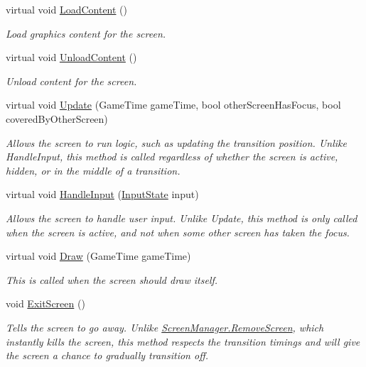 \begin{DoxyCompactItemize}
\item 
virtual void \hyperlink{classCityMania_1_1TEMP_1_1GUI_a12d7db05d306439cb79b57e379c45091}{LoadContent} ()
\begin{DoxyCompactList}\small\item\em Load graphics content for the screen. \item\end{DoxyCompactList}\item 
virtual void \hyperlink{classCityMania_1_1TEMP_1_1GUI_abc0a086362dacd228c79058353733fdf}{UnloadContent} ()
\begin{DoxyCompactList}\small\item\em Unload content for the screen. \item\end{DoxyCompactList}\item 
virtual void \hyperlink{classCityMania_1_1TEMP_1_1GUI_af8228ba5349b81662bb84b494f47a058}{Update} (GameTime gameTime, bool otherScreenHasFocus, bool coveredByOtherScreen)
\begin{DoxyCompactList}\small\item\em Allows the screen to run logic, such as updating the transition position. Unlike HandleInput, this method is called regardless of whether the screen is active, hidden, or in the middle of a transition. \item\end{DoxyCompactList}\item 
virtual void \hyperlink{classCityMania_1_1TEMP_1_1GUI_af9343aac3653346155565bf50e4995a3}{HandleInput} (\hyperlink{classCityMania_1_1InputState}{InputState} input)
\begin{DoxyCompactList}\small\item\em Allows the screen to handle user input. Unlike Update, this method is only called when the screen is active, and not when some other screen has taken the focus. \item\end{DoxyCompactList}\item 
virtual void \hyperlink{classCityMania_1_1TEMP_1_1GUI_a9d5035249dc023e58be6177595b2381b}{Draw} (GameTime gameTime)
\begin{DoxyCompactList}\small\item\em This is called when the screen should draw itself. \item\end{DoxyCompactList}\item 
void \hyperlink{classCityMania_1_1TEMP_1_1GUI_aa9856006e0de2b33f01205e004dbae6f}{ExitScreen} ()
\begin{DoxyCompactList}\small\item\em Tells the screen to go away. Unlike \hyperlink{classCityMania_1_1TEMP_1_1ScreenManager_a89569f0a358ed32c83beed2913194a88}{ScreenManager.RemoveScreen}, which instantly kills the screen, this method respects the transition timings and will give the screen a chance to gradually transition off. \item\end{DoxyCompactList}\end{DoxyCompactItemize}
